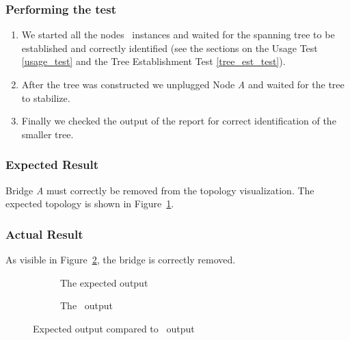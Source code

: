 \subsubsection*{Performing the test}
\begin{enumerate}
    \item We started all the nodes \tool\ instances and waited for the spanning tree to be established and correctly identified (see the sections on the Usage Test \ref{usage_test} and the Tree Establishment Test \ref{tree_est_test}).
    \item After the tree was constructed we unplugged Node \textit{A} and waited for the tree to stabilize.
    \item Finally we checked the output of the report for correct identification of the smaller tree.
\end{enumerate}

\subsubsection*{Expected Result}
Bridge \textit{A} must correctly be removed from the topology visualization.
The expected topology is shown in Figure~\ref{fig:removalExp}.

\subsubsection*{Actual Result}
As visible in Figure~\ref{fig:removal}, the bridge is correctly removed.
\begin{figure}[h]
    \begin{subfigure}[b]{\textwidth}
        \centering
        \caption{The expected output}
        \label{fig:removalExp}
    \end{subfigure}

    \vspace{0.5cm}

    \begin{subfigure}[b]{\textwidth}
        \centering
        \caption{The \tool\ output}
    \end{subfigure}
    \caption{Expected output compared to \tool\ output}
    \label{fig:removal}
\end{figure}

